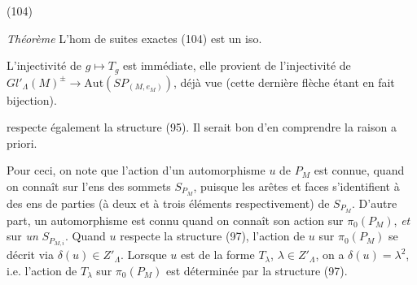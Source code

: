 \documentclass[11pt,a4paper]{article}
\begin{document}
(104)


\emph{Théorème} L'hom de suites exactes (104) est un iso.

L'injectivité de $g \longmapsto T_g$ est immédiate, elle provient de l'injectivité
 de $Gl'_{\Lambda}(M)^{\pm} \longrightarrow \mathrm{Aut}(SP_{(M,e_M)})$,
déjà vue (cette dernière flèche étant en fait bijection).


respecte également la structure (95). Il serait bon d'en comprendre la raison a
priori.

Pour ceci, on note  que l'action d'un automorphisme 
$u$ de $P_M$  est connue,
quand on  connaît sur l'ens des sommets $S_{P_M}$, puisque les
\struck{\ill{}}  arêtes et \struck{\ill{}}  faces
s'identifient à des ens de parties (à deux et à trois éléments respectivement) de
$S_{P_M}$. D'autre part, un automorphisme  est
connu quand on connaît son action sur $\pi_0(P_M)$, \emph{et} sur \emph{un}
$S_{P_{M,i}}$. Quand $u$ respecte  la structure (97), l'action de $u$
sur $\pi_0(P_M)$ se décrit via $\delta(u)\in Z'_{\Lambda}$. Lorsque $u$ est de la
forme $T_{\lambda}$, $\lambda\in Z'_{\Lambda}$, on a $\delta(u)=\lambda^{2}$, i.e.
l'action de $T_{\lambda}$ sur $\pi_0(P_M)$ est déterminée par la structure (97).
\end{document}
